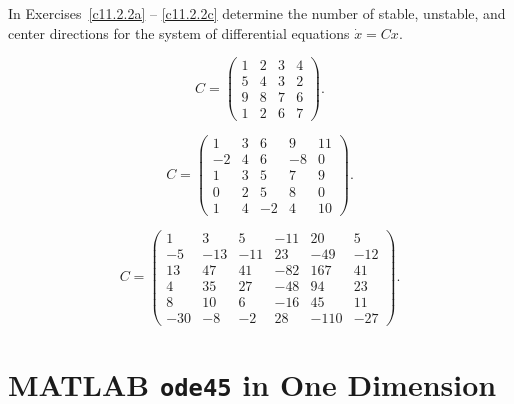 \documentclass{ximera}
\begin{document}
\noindent In Exercises~\ref{c11.2.2a} -- \ref{c11.2.2c} determine the number
of stable, unstable, and center directions for the system of differential 
equations $\dot{x}=Cx$.
\begin{exercise} \label{c11.2.2a}
\begin{equation*}
C=\left(\begin{array}{rrrr}
     1  &   2   &  3   &  4 \\
     5  &   4   &  3   &  2\\
     9  &   8   &  7   &  6\\
     1  &   2    & 6   &  7
\end{array}\right).
\end{equation*}
\end{exercise}
\begin{exercise} \label{c11.2.2b}
\begin{equation*}
C=\left(\begin{array}{rrrrr}
     1   &  3  &   6   &  9   & 11 \\
    -2   &  4  &   6   & -8   & 0 \\
     1   &  3  &   5   &  7   & 9 \\
     0   &  2  &   5   &  8   &  0 \\
     1   &  4  &  -2   &  4   & 10
\end{array}\right).
\end{equation*}
\end{exercise}
\begin{exercise} \label{c11.2.2c}
\begin{equation*}
C=\left(\begin{array}{rrrrrr}
    1  &  3  &  5  & -11 &  20  &   5 \\
   -5  & -13 & -11 &  23 & -49  & -12 \\
   13  &  47 &  41 & -82 & 167  &  41 \\
    4  &  35 &  27 & -48 &  94  &  23 \\
    8  &  10 &   6 & -16 &  45  &  11 \\
  -30  &  -8 &  -2 &  28 &-110  & -27
\end{array}\right).
\end{equation*}
\end{exercise}





\section{MATLAB {\tt ode45} in One Dimension}  \label{S:ode45}
\end{document}
